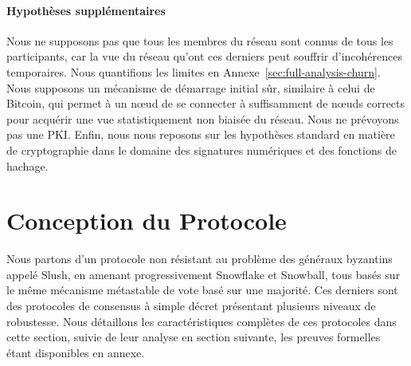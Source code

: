 \documentclass[letterpaper,twocolumn,10pt]{article}
\newcommand{\editinsert}[1]{{\color{blue}#1}}
\theoremstyle{definition}
\begin{document}
\paragraph{Hypothèses supplémentaires}
Nous ne supposons pas que tous les membres du réseau sont connus de tous les participants, car la vue du réseau qu'ont ces derniers peut souffrir d'incohérences temporaires.
Nous quantifions les limites en Annexe~\ref{sec:full-analysis-churn}.
Nous supposons un mécanisme de démarrage initial sûr, similaire à celui de Bitcoin, qui permet à un nœud de se connecter à suffisamment de nœuds corrects pour acquérir une vue statistiquement non biaisée du réseau.
Nous ne prévoyons pas une PKI\@.
Enfin, nous nous reposons sur les hypothèses standard en matière de cryptographie dans le domaine des signatures numériques et des fonctions de hachage.


\section{Conception du Protocole}\label{sec:protocol}
Nous partons d'un protocole non résistant au problème des généraux byzantins appelé Slush, en amenant
progressivement Snowflake et Snowball, tous basés sur le même mécanisme métastable de vote basé sur une majorité.
Ces derniers sont des protocoles de consensus à simple décret présentant plusieurs niveaux de robustesse. Nous
détaillons les caractéristiques complètes de ces protocoles dans cette section, suivie de leur analyse en section
suivante, les preuves formelles étant disponibles en annexe.

\end{document}
